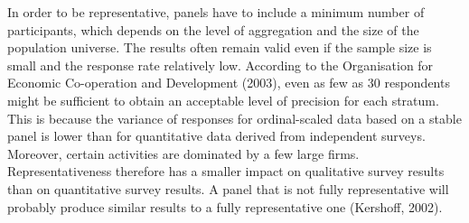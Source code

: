 \documentclass[11pt,]{article}
\begin{document}
\begin{table}[ht]
\centering
\caption{Sample characteristics} 
\end{table}

In order to be representative, panels have to include a minimum number
of participants, which depends on the level of aggregation and the size
of the population universe. The results often remain valid even if the
sample size is small and the response rate relatively low. According to
the Organisation for Economic Co-operation and Development (2003), even
as few as 30 respondents might be sufficient to obtain an acceptable
level of precision for each stratum. This is because the variance of
responses for ordinal-scaled data based on a stable panel is lower than
for quantitative data derived from independent surveys. Moreover,
certain activities are dominated by a few large firms.
Representativeness therefore has a smaller impact on qualitative survey
results than on quantitative survey results. A panel that is not fully
representative will probably produce similar results to a fully
representative one (Kershoff, 2002).
\end{document}
